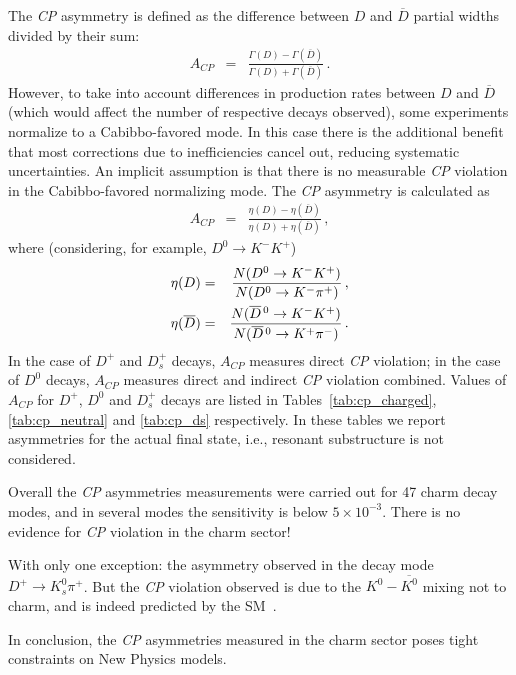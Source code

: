 \vspace{0.8cm}
The \emph{CP} asymmetry is defined as the difference between 
$D$ and $\overline{D}$ partial widths divided by their sum:
\begin{eqnarray}  
A_{CP} & = & \frac{\Gamma(D)-\Gamma(\overline{D})}
{\Gamma(D)+\Gamma(\overline{D})}\,.
\end{eqnarray}
However, to take into account differences in production rates between 
$D$ and $\overline{D}$ (which would affect the number of respective 
decays observed), some experiments normalize to a Cabibbo-favored 
mode. In this case there is the additional benefit that most corrections 
due to inefficiencies cancel out, reducing systematic uncertainties. An 
implicit assumption is that there is no measurable \emph{CP} 
violation in the Cabibbo-favored normalizing mode. 
The \emph{CP} asymmetry is calculated as
\begin{eqnarray}
A_{CP} & = & \frac{\eta(D)-\eta(\overline{D})}{\eta(D)+\eta(\overline{D})}\,,
\end{eqnarray}
where (considering, for example, $D^0 \to K^-K^+$)
\begin{eqnarray}
 \eta(D) & = & \frac{N(D^0 \rightarrow K^-K^+)}{N(D^0 \rightarrow K^-\pi^+)}\,, \\
 \eta(\overline{D}) & = & \frac{N(\overline{D}{}^{\,0}\rightarrow K^-K^+)}
{N(\overline{D}{}^{\,0}\rightarrow K^+\pi^-)}\,.
\end{eqnarray}
In the case of $D^+$ and $D^+_s$ decays, $A^{}_{CP}$ measures 
direct \emph{CP} violation; in the case of $D^0$ decays, $A^{}_{CP}$ 
measures direct and indirect \emph{CP} violation combined.
Values of $A^{}_{CP}$ for $D^+$, $D^0$ and $D_s^+$ decays are listed in
Tables~\ref{tab:cp_charged}, \ref{tab:cp_neutral} and \ref{tab:cp_ds} respectively.
In these tables we report asymmetries for the actual final state, i.e., resonant substructure 
is not considered.

Overall the \emph{CP} asymmetries measurements were carried out for 47 charm decay modes, and in
several modes the sensitivity is below $5 \times 10^{-3}$. There is no evidence for \emph{CP} violation 
in the charm sector!

With only one exception: the asymmetry observed in the decay mode $D^+ \to K^0_s\pi^+$. 
But the \emph{CP} violation observed is due to the $ K^0-\overline{K^0}$ mixing not to charm, and is indeed 
predicted by the SM~\cite{Grossman:2012aa}.

In conclusion, the \emph{CP} asymmetries measured in the charm sector poses tight constraints on New Physics models.

